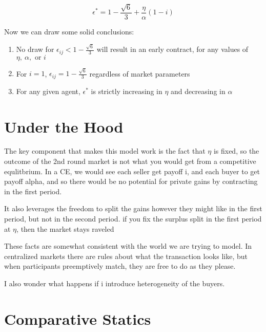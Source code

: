 \documentclass[WP]{AEA}
\begin{document}
\begin{equation}
\epsilon^* = 1 - \frac{\sqrt{6}}{3} + \frac{\eta}{\alpha} (1-i)
\end{equation}

Now we can draw some solid conclusions:

\begin{enumerate}
	\item No draw for $\epsilon_{ij} <  1 - \frac{\sqrt{6}}{3} $ will result in an early contract, for any values of $\eta, \ \alpha, \text{ or } i$
	\item For $ i = 1$,  $\epsilon_{ij} =  1 - \frac{\sqrt{6}}{3} $ regardless of market parameters
	\item For any given agent, $\epsilon^* $ is strictly increasing in $\eta$ and decreasing in $\alpha$
\end{enumerate}

%



\section{Under the Hood}
The key component that makes this model work is the fact that $\eta$ is fixed, so the outcome of the 2nd round market is not what you would get from a competitive equlitbrium.  In a CE, we would see each seller get payoff i, and each buyer to get payoff alpha, and so there would be no potential for private gains by contracting in the first period.  

It also leverages the freedom to split the gains however they might like in the first period, but not in the second period.  if you fix the surplus split in the first period at $\eta$, then the market stays raveled

These facts are somewhat consistent with the world we are trying to model.  In centralized markets there are rules about what the transaction looks like, but when participants preemptively match, they are free to do as they please.

I also wonder what happens if i introduce heterogeneity of the buyers.  

\section{Comparative Statics}
\end{document}
